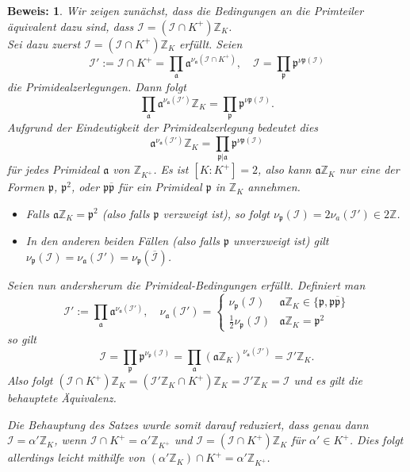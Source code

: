 \documentclass[12pt,a4paper,halfparskip,headsepline,bibtotocnumbered]{scrreprt}
\theoremstyle{nummermitklammern}
\theoremstyle{nonumberbreak}
\newtheorem{beweis}{Beweis:}
\newcommand{\Z}{\mathbb{Z}}
\newcommand{\I}{\mathcal{I}}
\newcommand{\p}{\mathfrak{p}}
\renewcommand{\a}{\mathfrak{a}}
\begin{document}
\begin{beweis}
	Wir zeigen zunächst, dass die Bedingungen an die Primteiler äquivalent dazu sind, dass $\I = (\I \cap K^+)\Z_K$.\\
	Sei dazu zuerst $\I = (\I \cap K^+)\Z_K$ erfüllt. Seien
	\begin{equation*}
		\I' := \I \cap K^+ = \prod_\a \a^{\nu_\a(\I \cap K^+)},\quad \I = \prod_\p \p^{\nu\p(\I)}
	\end{equation*} 
	die Primidealzerlegungen. Dann folgt
	\begin{equation*}
		\prod_\a \a^{\nu_\a(\I')} \Z_K = \prod_\p \p^{\nu\p(\I)}.
	\end{equation*}
	Aufgrund der Eindeutigkeit der Primidealzerlegung bedeutet dies
	\begin{equation*}
		\a^{\nu_\a(\I')} \Z_K = \prod_{\p\vert \a} \p^{\nu\p(\I)}
	\end{equation*}
	für jedes Primideal $\a$ von $\Z_{K^+}$. Es ist $\left[ K : K^+ \right] = 2$, also kann $\a\Z_K$ nur eine der Formen $\p$, $\p^2$, oder $\p\overline{\p}$ für ein Primideal $\p$ in $\Z_K$ annehmen.
	\begin{itemize}
		\item Falls $\a\Z_K = \p^2$ (also falls $\p$ verzweigt ist), so folgt $\nu_\p(\I) = 2 \nu_a(\I') \in 2 \Z$.
		\item In den anderen beiden Fällen (also falls $\p$ unverzweigt ist) gilt\linebreak
		$\nu_\p(\I) = \nu_\a(\I') = \nu_\p(\overline{\I})$.
	\end{itemize}
	Seien nun andersherum die Primideal-Bedingungen erfüllt. Definiert man
	\begin{equation*}
		\I' := \prod_\a \a^{\nu_\a(\I')}, \quad \nu_\a(\I') = \begin{cases} \nu_\p(\I) &\a \Z_K \in \lbrace \p, \p \overline{\p} \rbrace\\ \frac{1}{2}\nu_\p(\I) &\a\Z_K = \p^2 \end{cases}
	\end{equation*}
	so gilt
	\begin{equation*}
		\I = \prod_\p \p^{\nu_\p(\I)} = \prod_\a \left( \a \Z_K \right)^{\nu_\a(\I')} = \I' \Z_K.
	\end{equation*}
	Also folgt $(\I \cap K^+)\Z_K = (\I' \Z_K \cap K^+)\Z_K = \I' \Z_K = \I$ und es gilt die behauptete Äquivalenz.\par
	Die Behauptung des Satzes wurde somit darauf reduziert, dass genau dann $\I = \alpha' \Z_K$, wenn $\I \cap K^+ = \alpha' \Z_{K^+}$ und $\I = (\I \cap K^+)\Z_K$ für $\alpha' \in K^+$. Dies folgt allerdings leicht mithilfe von $(\alpha' \Z_K) \cap K^+ = \alpha'\Z_{K^+}$.
\end{beweis}
\end{document}
